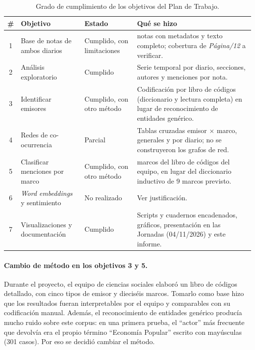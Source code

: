 \documentclass[11pt,a4paper]{article}
\newcommand{\pdoce}{\textit{Página/12}}
\begin{document}
\begin{table}[h]
\centering\small
\caption{Grado de cumplimiento de los objetivos del Plan de Trabajo.}
\label{tab:objetivos}
\begin{tabularx}{\linewidth}{c >{\raggedright}p{4.4cm} >{\raggedright}p{2.4cm} >{\raggedright\arraybackslash}X}
\toprule
\textbf{\#} & \textbf{Objetivo} & \textbf{Estado} & \textbf{Qué se hizo} \\
\midrule
1 & Base de notas de ambos diarios & Cumplido, con limitaciones & 1.245 notas con metadatos y texto completo; cobertura de \pdoce{} a verificar. \\
2 & Análisis exploratorio & Cumplido & Serie temporal por diario, secciones, autores y menciones por nota. \\
3 & Identificar emisores & Cumplido, con otro método & Codificación por libro de códigos (diccionario y lectura completa) en lugar de reconocimiento de entidades genérico. \\
4 & Redes de co-ocurrencia & Parcial & Tablas cruzadas emisor $\times$ marco, generales y por diario; no se construyeron los grafos de red. \\
5 & Clasificar menciones por marco & Cumplido, con otro método & 16 marcos del libro de códigos del equipo, en lugar del diccionario inductivo de 9 marcos previsto. \\
6 & \textit{Word embeddings} y sentimiento & No realizado & Ver justificación. \\
7 & Visualizaciones y documentación & Cumplido & Scripts y cuadernos encadenados, gráficos, presentación en las Jornadas (04/11/2026) y este informe. \\
\bottomrule
\end{tabularx}
\end{table}

\paragraph{Cambio de método en los objetivos 3 y 5.} Durante el proyecto, el equipo de ciencias sociales elaboró un libro de códigos detallado, con cinco tipos de emisor y dieciséis marcos. Tomarlo como base hizo que los resultados fueran interpretables por el equipo y comparables con su codificación manual. Además, el reconocimiento de entidades genérico producía mucho ruido sobre este corpus: en una primera prueba, el \enquote{actor} más frecuente que devolvía era el propio término \enquote{Economía Popular} escrito con mayúsculas (301 casos). Por eso se decidió cambiar el método.
\end{document}
